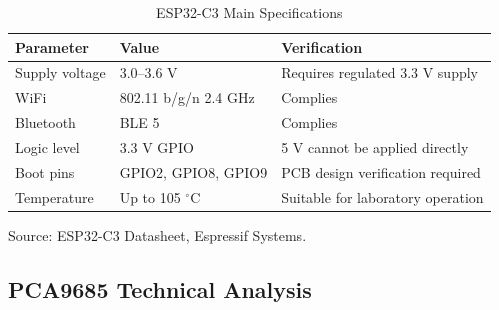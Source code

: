 \documentclass[lettersize,journal]{IEEEtran}
\begin{document}
	
	\begin{table}[H]
		\centering
		\caption{ESP32-C3 Main Specifications}
		\scriptsize
		
		\setlength{\tabcolsep}{2pt}
		\renewcommand{\arraystretch}{1.05}
		
		\begin{tabularx}{\columnwidth}
			{@{}P{2cm} P{2.2cm} Y@{}}
			
			\toprule
			Parameter & Value & Verification\\
			\midrule
			
			Supply voltage &
			3.0--3.6 V &
			Requires regulated 3.3 V supply \\
			
			WiFi &
			802.11 b/g/n 2.4 GHz &
			Complies \\
			
			Bluetooth &
			BLE 5 &
			Complies \\
			
			Logic level &
			3.3 V GPIO &
			5 V cannot be applied directly \\
			
			Boot pins &
			GPIO2, GPIO8, GPIO9 &
			PCB design verification required \\
			
			Temperature &
			Up to 105 $^\circ$C &
			Suitable for laboratory operation \\
			
			\bottomrule
			
		\end{tabularx}
		
	\end{table}
	
	
	Source: ESP32-C3 Datasheet, Espressif Systems. \cite{esp32c3}
	
	
	\subsection{PCA9685 Technical Analysis}
	
\end{document}
